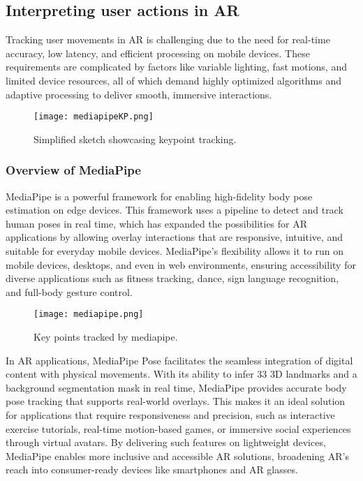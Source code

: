 \subsection{ Interpreting user actions in AR}

Tracking user movements in AR is challenging due to the need for real-time accuracy, low latency, and efficient processing on mobile devices.
These requirements are complicated by factors like variable lighting, fast motions, and limited device resources, all of which demand highly optimized algorithms and adaptive processing to deliver smooth, immersive interactions.

\begin{figure}[!h]
    \centering
    \texttt{[image: mediapipeKP.png]}
    \caption{Simplified sketch showcasing keypoint tracking.}
    \vspace{0.1cm}
    \label{fig:kptracking}
\end{figure}

\subsubsection{Overview of MediaPipe}

MediaPipe\cite{lugaresi2019mediapipe} is a powerful framework for enabling high-fidelity body pose estimation on edge devices.
This framework uses a pipeline to detect and track human poses in real time, which has expanded the possibilities for AR applications by allowing overlay interactions that are responsive, intuitive, and suitable for everyday mobile devices.
MediaPipe's flexibility allows it to run on mobile devices, desktops, and even in web environments, ensuring accessibility for diverse applications such as fitness tracking, dance, sign language recognition, and full-body gesture control.

\begin{figure}[!h]
    \centering
    \texttt{[image: mediapipe.png]}
    \caption{Key points tracked by mediapipe.}
    \vspace{0.1cm}
    \label{fig:mediapipe}
\end{figure}

In AR applications, MediaPipe Pose facilitates the seamless integration of digital content with physical movements.
With its ability to infer 33 3D landmarks and a background segmentation mask in real time, MediaPipe provides accurate body pose tracking that supports real-world overlays.
This makes it an ideal solution for applications that require responsiveness and precision, such as interactive exercise tutorials, real-time motion-based games, or immersive social experiences through virtual avatars.
By delivering such features on lightweight devices, MediaPipe enables more inclusive and accessible AR solutions, broadening AR’s reach into consumer-ready devices like smartphones and AR glasses.

